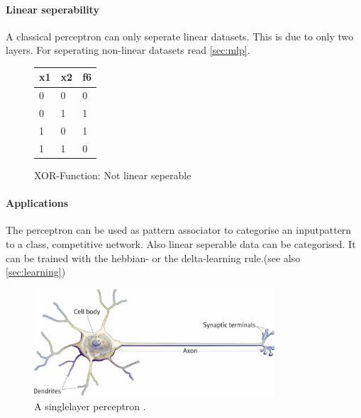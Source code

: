 \documentclass[10pt,a4paper,DIV=11]{scrreprt}
\begin{document}
\paragraph{Linear seperability}
A classical perceptron can only seperate linear datasets. This is due to only two layers. For seperating non-linear datasets read \ref{sec:mlp}.
\begin{figure}
	\centering
\begin{tabular}{|l|l|l|}
	\hline
	x1 & x2 & f6\\
	\hline
	0 & 0 & 0 \\
	\hline
	0 & 1 & 1 \\
	\hline
	1 & 0 & 1 \\
	\hline
	1 & 1 & 0 \\
	\hline
\end{tabular}
	\caption{XOR-Function: Not linear seperable}
	\label{fig:linsep1}
	
		
	
\end{figure}

\paragraph{Applications}
The perceptron can be used as pattern associator to categorise an inputpattern to a class, competitive network. Also linear seperable data can be categorised.
It can be trained with the hebbian- or the delta-learning rule.(see also \eqref{sec:learning})

\begin{center}
	\begin{figure}
		\includegraphics[width=0.8\textwidth,scale=1]{files/neuron.jpg}  
		\caption{A singlelayer perceptron \cite{PERSIN}.}
		\label{fig:neuron}
	\end{figure}
\end{center}
\end{document}
